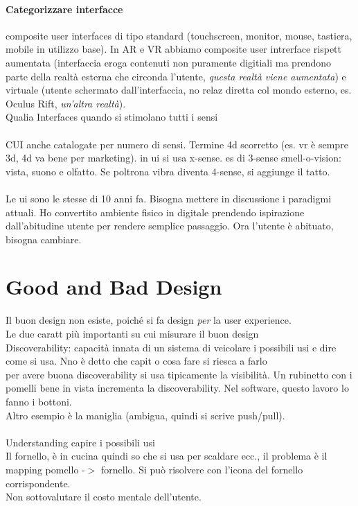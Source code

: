 \documentclass[10pt]{article}
\begin{document}
\paragraph{Categorizzare interfacce} composite user interfaces di tipo standard (touchscreen, monitor, mouse, tastiera, mobile in utilizzo base). In AR e VR abbiamo composite user intrerface rispett aumentata (interfaccia eroga contenuti non puramente digitiali ma prendono parte della realtà esterna che circonda l'utente, \textit{questa realtà viene aumentata}) e virtuale (utente schermato dall'interfaccia, no relaz diretta col mondo esterno, es. Oculus Rift, \textit{un'altra realtà}).\\
Qualia Interfaces quando si stimolano tutti i sensi\\\\
CUI anche catalogate per numero di sensi. Termine 4d scorretto (es. vr è sempre 3d, 4d va bene per marketing). in ui si usa x-sense. es di 3-sense smell-o-vision: vista, suono e olfatto. Se poltrona vibra diventa 4-sense, si aggiunge il tatto.\\\\
Le ui sono le stesse di 10 anni fa. Bisogna mettere in discussione i paradigmi attuali. Ho convertito ambiente fisico in digitale prendendo ispirazione dall'abitudine utente per rendere semplice passaggio. Ora l'utente è abituato, bisogna cambiare.

\section{Good and Bad Design}
Il buon design non esiste, poiché si fa design \textit{per} la user experience.\\
Le due caratt più importanti su cui misurare il buon design\\
Discoverability: capacità innata di un sistema di veicolare i possibili usi e dire come si usa. Nno è detto che capit o cosa fare si riesca a farlo\\
per avere buona discoverability si usa tipicamente la visibilità. Un rubinetto con i pomelli bene in vista incrementa la discoverability. Nel software, questo lavoro lo fanno i bottoni.\\
Altro esempio è la maniglia (ambigua, quindi si scrive push/pull).\\\\
Understanding capire i possibili usi\\
Il fornello, è in cucina quindi so che si usa per scaldare ecc., il problema è il mapping pomello -$>$ fornello. Si può risolvere con l'icona del fornello corrispondente.\\
Non sottovalutare il costo mentale dell'utente.\\
\end{document}
